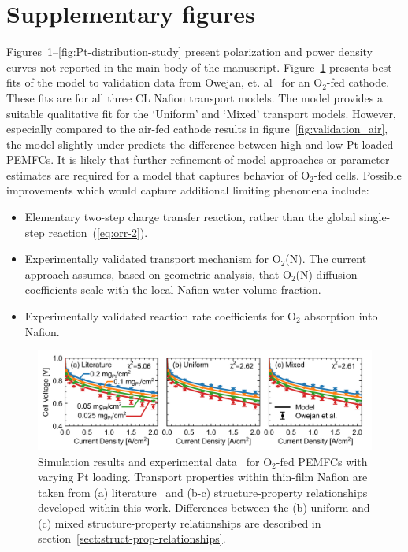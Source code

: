 \documentclass[final,3p,times,onecolumn]{elsarticle}    %
\begin{document}
\section{Supplementary figures}
Figures~\ref{fig:validation_o2}--\ref{fig:Pt-distribution-study} present polarization and power density curves not reported in the main body of the manuscript.  Figure~\ref{fig:validation_o2} presents best fits of the model to validation data from Owejan, et. al~\cite{bib:owejan_2013} for an O$_2$-fed cathode.  These fits are for all three CL Nafion transport models.  The model provides a suitable qualitative fit for the `Uniform' and `Mixed' transport models.  However, especially compared to the air-fed cathode results in figure~\ref{fig:validation_air}, the model slightly under-predicts the difference between high and low Pt-loaded PEMFCs. It is likely that further refinement of model approaches or parameter estimates are required for a model that captures behavior of O$_2$-fed cells. Possible improvements which would capture additional limiting phenomena include:
\begin{itemize}
    \item Elementary two-step charge transfer reaction, rather than the global single-step reaction~(\ref{eq:orr-2}).
    \item Experimentally validated transport mechanism for O$_2$(N). The current approach assumes, based on geometric analysis, that O$_2$(N) diffusion coefficients scale with the local Nafion water volume fraction.
    \item Experimentally validated reaction rate coefficients for O$_2$ absorption into Nafion.
\end{itemize}
\begin{figure}[H]
    \centering
    \includegraphics[width=6.47in]{figures/validation-o2-6_47in.png}
    \caption{Simulation results and experimental data~\cite{bib:owejan_2013} for O$_2$-fed PEMFCs with varying Pt loading. Transport properties within thin-film Nafion are taken from (a) literature~\cite{bib:yadav_2012, bib:sethuraman_2009} and (b-c) structure-property relationships developed within this work. Differences between the (b) uniform and (c) mixed structure-property relationships are described in section~\ref{sect:struct-prop-relationships}.}
    \label{fig:validation_o2}
\end{figure}
\end{document}
